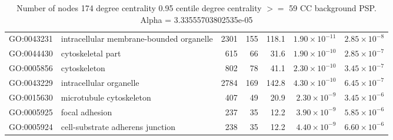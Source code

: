 \begin{table}[ht]
\begin{adjustbox}{max width=\textwidth}
\begin{tabular}{llrrrrr}
  GO:0043231 & intracellular membrane-bounded organelle & 2301 & 155 & 118.1 & $1.90 \times 10^{-11}$ & $2.85 \times 10^{-8}$ \\ 
  GO:0044430 & cytoskeletal part & 615 & 66 & 31.6 & $1.90 \times 10^{-10}$ & $2.85 \times 10^{-7}$ \\ 
  GO:0005856 & cytoskeleton & 802 & 78 & 41.1 & $2.30 \times 10^{-10}$ & $3.45 \times 10^{-7}$ \\ 
  GO:0043229 & intracellular organelle & 2784 & 169 & 142.8 & $4.30 \times 10^{-10}$ & $6.45 \times 10^{-7}$ \\ 
  GO:0015630 & microtubule cytoskeleton & 407 & 49 & 20.9 & $2.30 \times 10^{-9}$ & $3.45 \times 10^{-6}$ \\ 
  GO:0005925 & focal adhesion & 237 & 35 & 12.2 & $3.90 \times 10^{-9}$ & $5.85 \times 10^{-6}$ \\ 
  GO:0005924 & cell-substrate adherens junction & 238 & 35 & 12.2 & $4.40 \times 10^{-9}$ & $6.60 \times 10^{-6}$ \\ 
   \hline
\end{tabular}
\end{adjustbox}
\caption{Number of nodes 174 degree centrality 0.95 centile  degree centrality $>=$ 59 CC background PSP. Alpha = 3.33555703802535e-05} 
\label{tab:Number of nodes 174 degree centrality 0.95 centile  degree centrality >= 59 CC background PSP. Alpha = 3.33555703802535e-05}
\end{table}

